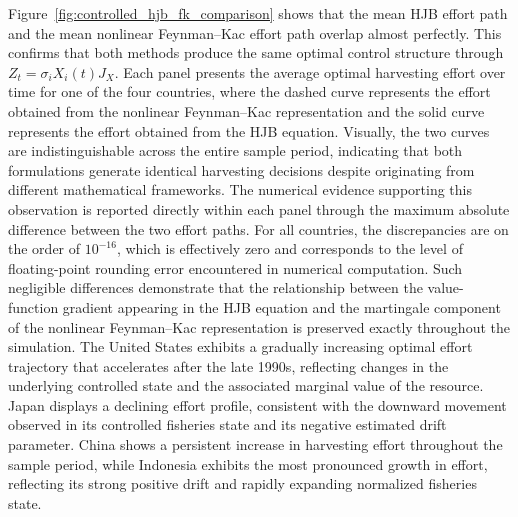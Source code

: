 \documentclass[11pt]{article}
\begin{document}
	Figure~\ref{fig:controlled_hjb_fk_comparison} shows that the mean HJB effort path and the mean nonlinear Feynman--Kac effort path overlap almost perfectly. This confirms that both methods produce the same optimal control structure through $Z_t=\sigma_iX_i(t)J_X.$
	Each panel presents the average optimal harvesting effort over time for one of the four countries, where the dashed curve represents the effort obtained from the nonlinear Feynman--Kac representation and the solid curve represents the effort obtained from the HJB equation. Visually, the two curves are indistinguishable across the entire sample period, indicating that both formulations generate identical harvesting decisions despite originating from different mathematical frameworks. The numerical evidence supporting this observation is reported directly within each panel through the maximum absolute difference between the two effort paths. For all countries, the discrepancies are on the order of $10^{-16}$, which is effectively zero and corresponds to the level of floating-point rounding error encountered in numerical computation. Such negligible differences demonstrate that the relationship between the value-function gradient appearing in the HJB equation and the martingale component of the nonlinear Feynman--Kac representation is preserved exactly throughout the simulation. The United States exhibits a gradually increasing optimal effort trajectory that accelerates after the late 1990s, reflecting changes in the underlying controlled state and the associated marginal value of the resource. Japan displays a declining effort profile, consistent with the downward movement observed in its controlled fisheries state and its negative estimated drift parameter. China shows a persistent increase in harvesting effort throughout the sample period, while Indonesia exhibits the most pronounced growth in effort, reflecting its strong positive drift and rapidly expanding normalized fisheries state. 
	
\end{document}
